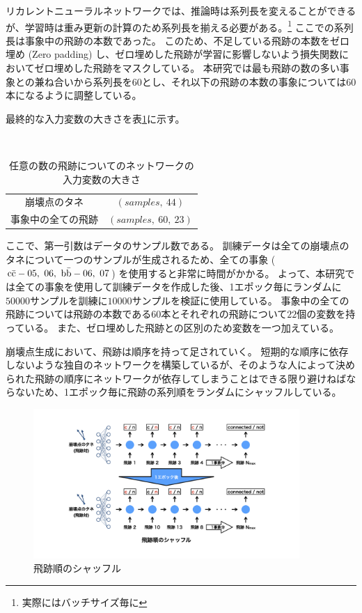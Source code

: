 リカレントニューラルネットワークでは、推論時は系列長を変えることができるが、学習時は重み更新の計算のため系列長を揃える必要がある。\footnote{実際にはバッチサイズ毎に}
ここでの系列長は事象中の飛跡の本数であった。
このため、不足している飛跡の本数をゼロ埋め (Zero padding) し、ゼロ埋めした飛跡が学習に影響しないよう損失関数においてゼロ埋めした飛跡をマスクしている。
本研究では最も飛跡の数の多い事象との兼ね合いから系列長を$60$とし、それ以下の飛跡の本数の事象については$60$本になるように調整している。

最終的な入力変数の大きさを表\ref{VLSTMInputParameterShape}に示す。

\begin{table}[htb]
 \centering
　\small
  \begin{tabular}{c c}\hline
    崩壊点のタネ & $(samples,\ 44)$ \\
    事象中の全ての飛跡 & $(samples,\ 60,\ 23)$ \\\hline
  \end{tabular}
  \caption{任意の数の飛跡についてのネットワークの入力変数の大きさ}
  \label{VLSTMInputParameterShape}
\end{table}

ここで、第一引数はデータのサンプル数である。
訓練データは全ての崩壊点のタネについて一つのサンプルが生成されるため、全ての事象 ($\rm c\bar{c}-05,\ 06,\ \rm b\bar{b}-06,\ 07$) を使用すると非常に時間がかかる。
よって、本研究では全ての事象を使用して訓練データを作成した後、1エポック毎にランダムに$50000$サンプルを訓練に$10000$サンプルを検証に使用している。
事象中の全ての飛跡については飛跡の本数である$60$本とそれぞれの飛跡について$22$個の変数を持っている。
また、ゼロ埋めした飛跡との区別のため変数を一つ加えている。

崩壊点生成において、飛跡は順序を持って足されていく。
短期的な順序に依存しないような独自のネットワークを構築しているが、そのような人によって決められた飛跡の順序にネットワークが依存してしまうことはできる限り避けねばならないため、1エポック毎に飛跡の系列順をランダムにシャッフルしている。

\begin{figure}[htbp]
 \centering
 \includegraphics[trim = 150 50 150 0, width=0.9\textwidth, clip]{Figure/3Networks/3-4-2-1TrackShuffle.png}
 \caption{飛跡順のシャッフル}
 \label{3-4-2-1TrackShuffle}
\end{figure}

